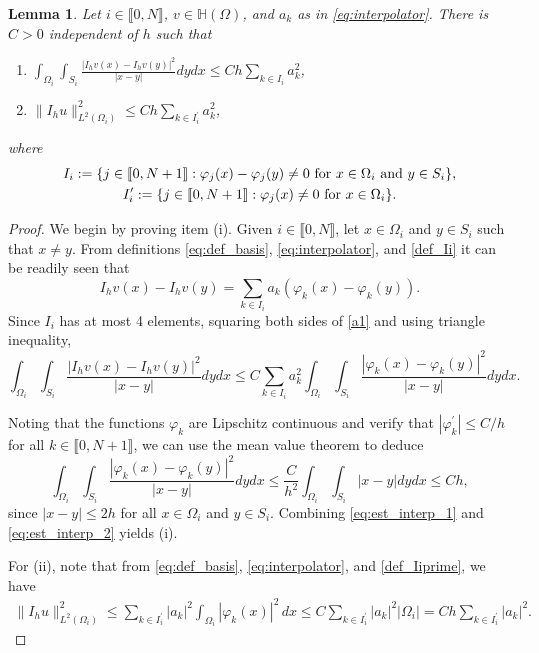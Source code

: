 \documentclass[11 pt]{article}
\newcommand\inter[1]{\llbracket #1\rrbracket}
\newtheorem{lemma}[theorem]{Lemma}
\numberwithin{equation}{section}
\begin{document}
\begin{lemma}\label{lem:loc_norm_interp}
Let $i\in\inter{0,N}$, $v\in \mathbb H(\Omega)$, and $a_k$ as in \eqref{eq:interpolator}.  There is $C>0$ independent of $h$ such that
%
\begin{enumerate}[label=\upshape(\roman*)]
\item $\displaystyle \int_{\Omega_i}\int_{S_i}\frac{|I_hv(x)-I_hv(y)|^2}{|x-y|}dy dx\leq Ch\sum_{k\in I_i} a_k^2$,
\item  $\displaystyle \|I_h u\|^2_{L^2(\Omega_i)}\leq Ch\sum_{k\in I_i^\prime} a_k^2$,
\end{enumerate}
where
%
\begin{gather}\label{def_Ii}
I_i:=\{j\in\inter{0,N+1}:\varphi_j(x)-\varphi_j(y) \neq 0 \ \textnormal{for $x\in \Omega_i$ and $y\in S_i$}\}, \\ \label{def_Iiprime}
I^\prime_i:=\{j\in\inter{0,N+1}:\varphi_j(x)\neq 0 \ \textnormal{for $x\in \Omega_i$}\}.
\end{gather}
%
\end{lemma}
\begin{proof}
We begin by proving item (i). Given $i\in\inter{0,N}$, let $x\in \Omega_i$ and $y\in S_i$ such that $x\neq y$.  From definitions \eqref{eq:def_basis}, \eqref{eq:interpolator}, and \eqref{def_Ii} it can be readily seen that
%
\begin{equation}\label{a1}
    I_hv(x)-I_hv(y)=\sum_{k\in I_i} a_k(\varphi_k(x)-\varphi_k(y)).
\end{equation}
%
Since $I_i$ has at most 4 elements, squaring both sides of \eqref{a1} and using triangle inequality,
%
\begin{equation}\label{eq:est_interp_1}
    \int_{\Omega_i}\int_{S_i}\frac{|I_hv(x)- I_hv(y)|^2}{|x-y|} dy dx \leq C \sum_{k\in I_i} a_k^2\int_{\Omega_i}\int_{S_i} \frac{|\varphi_k(x)- \varphi_k(y)|^2}{|x-y|} dy dx.
\end{equation}
%

Noting that the functions $\varphi_k$ are Lipschitz continuous and verify that $|\varphi_k^\prime|\leq C/h$ for all $k\in\inter{0,N+1}$, we can use the mean value theorem to deduce
%
\begin{equation}\label{eq:est_interp_2}
    \int_{\Omega_i}\int_{S_i}\frac{|\varphi_k(x)-\varphi_k(y)|^2}{|x-y|}dy dx \leq \frac{C}{h^2}\int_{\Omega_i}\int_{S_i}|x-y|dy dx \leq Ch,
\end{equation}
%
since $|x-y|\leq 2h$ for all $x\in \Omega_i$ and $y\in S_i$. Combining \eqref{eq:est_interp_1} and \eqref{eq:est_interp_2} yields (i). 

For (ii), note that from \eqref{eq:def_basis}, \eqref{eq:interpolator}, and \eqref{def_Iiprime}, we have
\begin{align*}
\|I_h u\|^2_{L^2(\Omega_i)}
\leq \sum_{k\in I_i^\prime}|a_k|^2\int_{\Omega_i}|\varphi_k(x)|^2\, dx
\leq C\sum_{k\in I_i^\prime}|a_k|^2|\Omega_i|
=Ch\sum_{k\in I_i^\prime}|a_k|^2.
\end{align*}
%
\end{proof}
\end{document}
